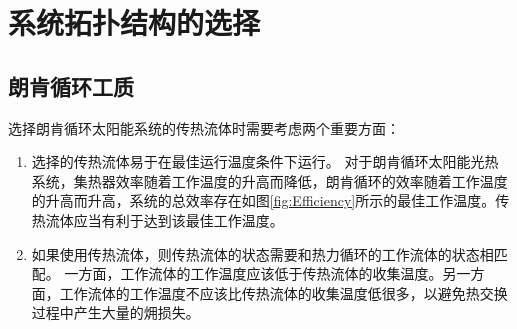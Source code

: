 \section{系统拓扑结构的选择}
\label{sec:sts}
\subsection{朗肯循环工质}

选择朗肯循环太阳能系统的传热流体时需要考虑两个重要方面：
\begin{enumerate}
  \item 选择的传热流体易于在最佳运行温度条件下运行。
  对于朗肯循环太阳能光热系统，集热器效率随着工作温度的升高而降低，朗肯循环的效率随着工作温度的升高而升高，系统的总效率存在如图\ref{fig:Efficiency}所示的最佳工作温度。传热流体应当有利于达到该最佳工作温度。  
  
  \item 如果使用传热流体，则传热流体的状态需要和热力循环的工作流体的状态相匹配。
  一方面，工作流体的工作温度应该低于传热流体的收集温度。另一方面，工作流体的工作温度不应该比传热流体的收集温度低很多，以避免热交换过程中产生大量的㶲损失。
  
\end{enumerate}
